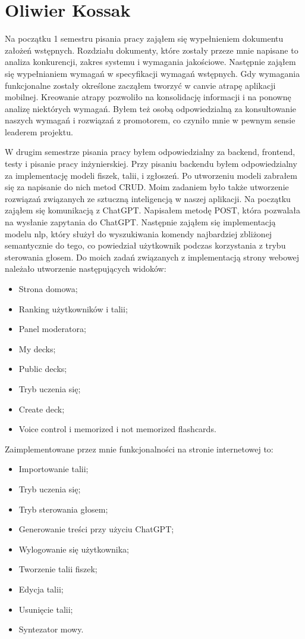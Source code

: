 \section{Oliwier Kossak}

Na początku 1 semestru pisania pracy zająłem się wypełnieniem dokumentu założeń wstępnych.
Rozdziału dokumenty, które zostały przeze mnie napisane to analiza konkurencji, zakres systemu i wymagania jakościowe.
Następnie zająłem się wypełnianiem wymagań w specyfikacji wymagań wstępnych.
Gdy wymagania funkcjonalne zostały określone zacząłem tworzyć w canvie atrapę aplikacji mobilnej.
Kreowanie atrapy pozwoliło na konsolidację informacji i na ponownę analizę niektórych wymagań.
Byłem też osobą odpowiedzialną za konsultowanie naszych wymagań i rozwiązań z promotorem, co czyniło mnie w pewnym
sensie leaderem projektu.
\par W drugim semestrze pisania pracy byłem odpowiedzialny za backend, frontend, testy i pisanie pracy
inżynierskiej. Przy pisaniu backendu byłem odpowiedzialny za implementację modeli fiszek, talii, i zgłoszeń.
Po utworzeniu modeli zabrałem się za napisanie do nich metod CRUD.
Moim zadaniem było także utworzenie rozwiązań związanych ze sztuczną inteligencją w naszej aplikacji.
Na początku zająłem się komunikacją z ChatGPT. Napisałem metodę POST, która pozwalała na wysłanie zapytania do ChatGPT.
Następnie zająłem się implementacją modelu nlp, który służył do wyszukiwania komendy najbardziej zbliżonej semantycznie
do tego, co powiedział użytkownik podczas korzystania z trybu sterowania głosem. Do moich zadań związanych z
implementacją strony webowej należało utworzenie następujących widoków:
\begin{itemize}
    \item Strona domowa;
    \item Ranking użytkowników i talii;
    \item Panel moderatora;
    \item My decks;
    \item Public decks;
    \item Tryb uczenia się;
    \item Create deck;
    \item Voice control i memorized i not memorized flashcards.
\end{itemize}

Zaimplementowane przez mnie funkcjonalności na stronie internetowej to:

\begin{itemize}
    \item Importowanie talii;
    \item Tryb uczenia się;
    \item Tryb sterowania głosem;
    \item Generowanie treści przy użyciu ChatGPT;
    \item Wylogowanie się użytkownika;
    \item Tworzenie talii fiszek;
    \item Edycja talii;
    \item Usunięcie talii;
    \item Syntezator mowy.
\end{itemize}

